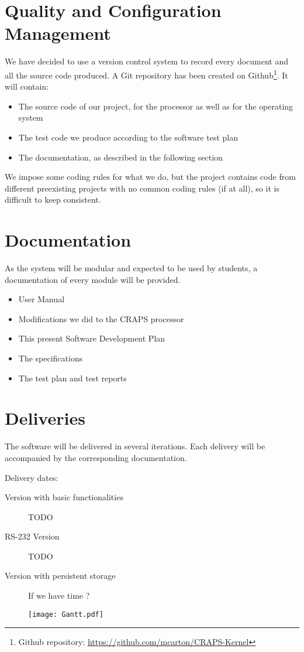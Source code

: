 \documentclass{article}
\begin{document}
  \section{Quality and Configuration Management}
    We have decided to use a version control system to record every document and
    all the source code produced. A Git repository has been created on
    Github\footnote{Github repository:
    \url{https://github.com/mcarton/CRAPS-Kernel}}.
    It will contain:
    \begin{itemize}
      \item The source code of our project, for the processor as well as for the
            operating system
      \item The test code we produce according to the software test plan
      \item The documentation, as described in the following section
    \end{itemize}

    We impose some coding rules for what we do, but the project contains code
    from different preexisting projects with no common coding rules (if at all),
    so it is difficult to keep consistent.

  \section{Documentation}
    As the system will be modular and expected to be used by students, a
    documentation of every module will be provided.

    \begin{itemize}
      \item User Manual
      \item Modifications we did to the CRAPS processor
      \item This present Software Development Plan
      \item The specifications
      \item The test plan and test reports
    \end{itemize}

    \section{Deliveries}
      The software will be delivered in several iterations.
      Each delivery will be accompanied by the corresponding documentation.

      Delivery dates:
      \begin{description}
        \item[Version with basic functionalities] TODO
        \item[RS-232 Version] TODO
        \item[Version with persistent storage] If we have time ?
      \end{description}

    \thispagestyle{empty}
    \begin{figure}
      \centering
      \texttt{[image: Gantt.pdf]}
      \label{fig:gantt}
    \end{figure}
    \clearpage
    \restoregeometry
\end{document}
